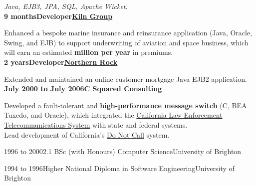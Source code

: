 \documentclass[a4paper,12pt]{article}
\newcommand{\head}[1]{\needspace{6em}\begin{center}{\large{\textbf{\sc{#1}}}}\nopagebreak\end{center}}
\newcommand{\jobheld}[2]{\textbf{#1\hfill #2}\nopagebreak}
\newcommand{\clientwork}[3]{\textbf{#1\hfill#3\hfill#2}\nopagebreak}
\newcommand{\tab}{\hspace{2em}}
\newcommand{\education}[3]{#1\tab#2\hfill#3}
\newcommand{\techstack}[1]{\textit{#1}}
\begin{document}
\techstack{Java, EJB3, JPA, SQL, Apache Wicket.}\\

\clientwork{9 months}{\href{http://www.tokiomarinekiln.com/}{Kiln Group}}{Developer}

Enhanced a bespoke marine insurance and reinsurance application (Java, Oracle, Swing, and EJB) to support underwriting of aviation and space business, which will earn an estimated \textbf{ million per year} in premiums.\\

\clientwork{2 years}{\href{http://www.northernrock.co.uk}{Northern Rock}}{Developer}

Extended and maintained an online customer mortgage Java EJB2 application.\\

\jobheld{July 2000 to July 2006}{C Squared Consulting}

Developed a fault-tolerant and \textbf{high-performance message switch} (C, BEA Tuxedo, and Oracle), which integrated the \href{http://definitions.uslegal.com/c/clets/}{California Law Enforcement Telecommunications System} with state and federal systems.\\

Lead development of California's \href{http://www.sfgate.com/cgi-bin/article.cgi?f=/c/a/2003/03/31/MN5478.DTL}{Do Not Call} system.\\

\head{Education}

\education{1996 to 2000}{2.1 BSc (with Honours) Computer Science}{University of Brighton}

\education{1994 to 1996}{Higher National Diploma in Software Engineering}{University of Brighton}
\end{document}
